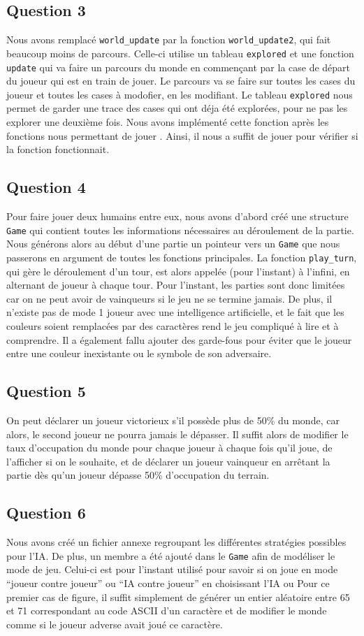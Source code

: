\documentclass{article}
\begin{document}
\subsection{Question 3}
    Nous avons remplacé \texttt{world\_update} par la fonction \texttt{world\_update2}, qui fait beaucoup moins de parcours. Celle-ci utilise un tableau \texttt{explored} et une fonction \texttt{update} qui va faire un parcours du monde en commençant par la case de départ du joueur qui est en train de jouer. Le parcours va se faire sur toutes les cases du joueur et toutes les cases à modofier, en les modifiant. Le tableau \texttt{explored} nous permet de garder une trace des cases qui ont déja été explorées, pour ne pas les explorer une deuxième fois. Nous avons implémenté cette fonction après les fonctions nous permettant de jouer . Ainsi, il nous a suffit de jouer pour vérifier si la fonction fonctionnait.
\subsection{Question 4}
    Pour faire jouer deux humains entre eux, nous avons d'abord créé une structure \texttt{Game} qui contient toutes les informations nécessaires au déroulement de la partie. Nous générons alors au début d'une partie un pointeur vers un \texttt{Game} que nous passerons en argument de toutes les fonctions principales. La fonction \texttt{play\_turn}, qui gère le déroulement d'un tour, est alors appelée (pour l'instant) à l'infini, en alternant de joueur à chaque tour. Pour l'instant, les parties sont donc limitées car on ne peut avoir de vainqueurs si le jeu ne se termine jamais. De plus, il n'existe pas de mode 1 joueur avec une intelligence artificielle, et le fait que les couleurs soient remplacées par des caractères rend le jeu compliqué à lire et à comprendre. Il a également fallu ajouter des garde-fous pour éviter que le joueur entre une couleur inexistante ou le symbole de son adversaire.
\subsection{Question 5}
    On peut déclarer un joueur victorieux s'il possède plus de 50\% du monde, car alors, le second joueur ne pourra jamais le dépasser. Il suffit alors de modifier le taux d'occupation du monde pour chaque joueur à chaque fois qu'il joue, de l'afficher si on le souhaite, et de déclarer un joueur vainqueur en arrêtant la partie dès qu'un joueur dépasse 50\% d'occupation du terrain.
\subsection{Question 6}
    Nous avons créé un fichier annexe regroupant les différentes stratégies possibles pour l'IA. De plus, un membre a été ajouté dans le \texttt{Game} afin de modéliser le mode de jeu. Celui-ci est pour l'instant utilisé pour savoir si on joue en mode \enquote{joueur contre joueur} ou \enquote{IA contre joueur} en choisissant l'IA ou Pour ce premier cas de figure, il suffit simplement de générer un entier aléatoire entre 65 et 71 correspondant au code ASCII d'un caractère et de modifier le monde comme si le joueur adverse avait joué ce caractère.
\end{document}

